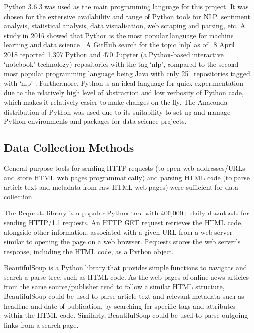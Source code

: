 \documentclass{report}
\begin{document}
Python 3.6.3 \cite{Python} was used as the main programming language for this project.
It was chosen for the extensive availability and range of Python tools for NLP, sentiment analysis, statistical analysis, data visualisation, web scraping and parsing, etc.
A study in 2016 showed that Python is the most popular language for machine learning and data science \cite{puget2016most}.
A GitHub search for the topic `nlp' as of 18 April 2018 reported 1,397 Python and 470 Jupyter (a Python-based interactive `notebook' technology) repositories with the tag `nlp', compared to the second most popular programming language being Java with only 251 repositories tagged with `nlp' \cite{GitHubNLP}.
Furthermore, Python is an ideal language for quick experimentation due to the relatively high level of abstraction and low verbosity of Python code, which makes it relatively easier to make changes on the fly.
The Anaconda distribution of Python \cite{Anaconda} was used due to its suitability to set up and manage Python environments and packages for data science projects.

\subsection{Data Collection Methods} \label{tc-data-collection}
General-purpose tools for sending HTTP requests (to open web addresses/URLs and store HTML web pages programmatically) and parsing HTML code (to parse article text and metadata from raw HTML web pages) were sufficient for data collection.

The Requests library \cite{Requests} is a popular Python tool with 400,000+ daily downloads for sending HTTP/1.1 requests.
An HTTP GET request retrieves the HTML code, alongside other information, associated with a given URL from a web server, similar to opening the page on a web browser. 
Requests stores the web server's response, including the HTML code, as a Python object.

BeautifulSoup \cite{BeautifulSoup} is a Python library that provides simple functions to navigate and search a parse tree, such as HTML code.
As the web pages of online news articles from the same source/publisher tend to follow a similar HTML structure, BeautifulSoup could be used to parse article text and relevant metadata such as headline and date of publication, by searching for specific tags and attributes within the HTML code.
Similarly, BeautifulSoup could be used to parse outgoing links from a search page.
\end{document}
